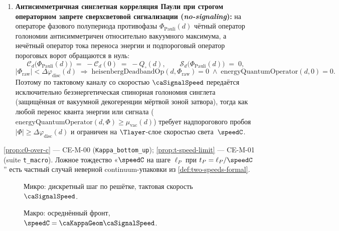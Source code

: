 \begin{theorem}
\begin{enumerate}[label=\textbf{(\roman*)},leftmargin=*]
\begin{equation}
    \qquad
    \mathrm{tsirelsonQmSqOp}(d) \;=\; \mathrm{c0OverCSqOp}(d)\cdot\mathrm{bellLhvSqOp}(d) \;=\; |{\triangle}(d)|.
  \end{equation}
  Тем самым отношение квантового оператора Цирельсона к классическому оператору Белла тождественно равно отношению тактовой скорости звена $\caSignalSpeed$ к скорости света $\speedC$:
  \[
    \frac{\mathrm{tsirelsonQmSqOp}(d)}{\mathrm{bellLhvSqOp}(d)}
    \;=\; \frac{\mathrm{bellLhvSqOp}(d)}{\mathrm{bellSeparableSqOp}(d)}
    \;=\; \frac{|{\triangle}(d)|}{d_{\mathrm{in}}(\square)}
    \;=\; \mathrm{c0OverCSqOp}(d)
    \;=\; \left(\frac{\caSignalSpeed}{\speedC}\right)^{\!2}.
  \]
\item \textbf{Антисимметричная синглетная корреляция Паули при строгом операторном запрете сверхсветовой сигнализации (\emph{no-signaling}):}
  на операторе фазового полупериода противофазы $\Phi_{\mathrm{Pauli}}(d)$ чётный оператор голономии антисимметричен относительно вакуумного максимума, а нечётный оператор тока переноса энергии и подпороговый оператор пороговых ворот обращаются в нуль:
  \[
    \mathcal{C}_d\bigl(\Phi_{\mathrm{Pauli}}(d)\bigr) \;=\; -\mathcal{C}_d(0) \;=\; -Q_\square(d),
    \qquad
    \mathcal{S}_d\bigl(\Phi_{\mathrm{Pauli}}(d)\bigr) \;=\; 0,
  \]
  \[
    |\Phi_{\mathrm{raw}}| < \Delta\varphi_{\mathrm{disc}}(d)
    \;\Longrightarrow\;
    \mathrm{heisenbergDeadbandOp}(d,\Phi_{\mathrm{raw}}) = 0
    \;\wedge\;
    \mathrm{energyQuantumOperator}(d,0) = 0.
  \]
  Поэтому по тактовому каналу со скоростью $\caSignalSpeed$ передаётся исключительно безэнергетическая спинорная голономия синглета (защищённая от вакуумной декогеренции мёртвой зоной затвора), тогда как любой перенос кванта энергии или сигнала ($\mathrm{energyQuantumOperator}(d,\Phi) \ge \mu_{\mathrm{vac}}(d)$) требует надпорогового пробоя $|\Phi|\ge\Delta\varphi_{\mathrm{disc}}(d)$ и ограничен на $\Tlayer$-слое скоростью света~$\speedC$.
\end{enumerate}
\end{theorem}

\begin{remark}[Сверка]
\label{rem:two-c-burden}
\cref{prop:c0-over-c} --- CE-M-00 (\texttt{Kappa\_bottom\_up});
\cref{prop:t-speed-limit} --- CE-M-01 (suite \texttt{t\_macro}).
Ложное тождество «$\speedC$ на шаге $\ell_P$ при $t_P=\ell_P/\speedC$'' есть частный случай
неверной continuum-упаковки из \cref{def:two-speeds-formal}.
\end{remark}

\begin{figure}[htbp]
  \centering
  
  \caption{Микро: дискретный шаг по решётке, тактовая скорость $\caSignalSpeed$.}
  \label{fig:carrier-two-speeds-micro}
\end{figure}

\begin{figure}[htbp]
  \centering
  
  \caption{Макро: осреднённый фронт, $\speedC=\caKappaGeom \caSignalSpeed$.}
  \label{fig:carrier-two-speeds-macro}
\end{figure}

